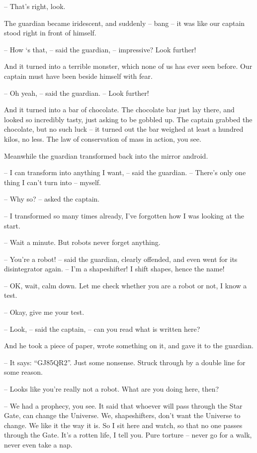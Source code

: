 \documentclass[ebook,twoside,final,openright]{memoir}
\begin{document}
– That's right, look.\par
\par
The guardian became iridescent, and suddenly – bang – it was like our captain stood right in front of himself.\par
– How ‘s that, – said the guardian, – impressive? Look further!\par
And it turned into a terrible monster, which none of us has ever seen before. Our captain must have been beside himself with fear.\par
– Oh yeah, – said the guardian. – Look further!\par
\par
And it turned into a bar of chocolate. The chocolate bar just lay there, and looked so incredibly tasty, just asking to be gobbled up. The captain grabbed the chocolate, but no such luck – it turned out the bar weighed at least a hundred kilos, no less. The law of conservation of mass in action, you see.\par
\par
Meanwhile the guardian transformed back into the mirror android.\par
– I can transform into anything I want, – said the guardian. – There’s only one thing I can’t turn into – myself.\par
– Why so? – asked the captain.\par
– I transformed so many times already, I’ve forgotten how I was looking at the start.\par
– Wait a minute. But robots never forget anything.\par
– You’re a robot! – said the guardian, clearly offended, and even went for its disintegrator again. – I’m a shapeshifter! I shift shapes, hence the name!\par
– OK, wait, calm down. Let me check whether you are a robot or not, I know a test.\par
– Okay, give me your test.\par
– Look, – said the captain, – can you read what is written here?\par
And he took a piece of paper, wrote something on it, and gave it to the guardian.\par
– It says: “GJ85QR2”. Just some nonsense. Struck through by a double line for some reason.\par
– Looks like you're really not a robot. What are you doing here, then?\par
– We had a prophecy, you see. It said that whoever will pass through the Star Gate, can change the Universe. We, shapeshifters, don’t want the Universe to change. We like it the way it is. So I sit here and watch, so that no one passes through the Gate. It’s a rotten life, I tell you. Pure torture – never go for a walk, never even take a nap.\par
\end{document}
